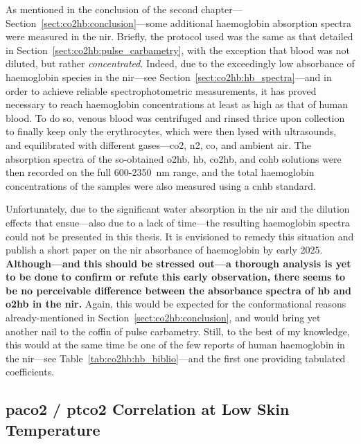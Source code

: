 As mentioned in the conclusion of the second chapter---Section~\ref{sect:co2hb:conclusion}---some additional haemoglobin absorption spectra were measured in the \gls{nir}. Briefly, the protocol used was the same as that detailed in Section~\ref{sect:co2hb:pulse_carbametry}, with the exception that blood was not diluted, but rather \emph{concentrated}. Indeed, due to the exceedingly low absorbance of haemoglobin species in the \gls{nir}---see Section~\ref{sect:co2hb:hb_spectra}---and in order to achieve reliable spectrophotometric measurements, it has proved necessary  to reach haemoglobin concentrations at least as high as that of human blood. To do so, venous blood was centrifuged and rinsed thrice upon collection to finally keep only the erythrocytes, which were then lysed with ultrasounds, and equilibrated with different gases---\gls{co2}, \gls{n2}, \gls{co}, and ambient air. The absorption spectra of the so-obtained \gls{o2hb}, \gls{hb}, \gls{co2hb}, and \gls{cohb} solutions were then recorded on the full 600-2350~nm range, and the total haemoglobin concentrations of the samples were also measured using a \gls{cnhb} standard.

Unfortunately, due to the significant water absorption in the \gls{nir} and the dilution effects that ensue---also due to a lack of time---the resulting haemoglobin spectra could not be presented in this thesis. It is envisioned to remedy this situation and publish a short paper on the \gls{nir} absorbance of haemoglobin by early 2025. \textbf{Although---and this should be stressed out---a thorough analysis is yet to be done to confirm or refute this early observation, there seems to be no perceivable difference between the absorbance spectra of \gls{hb} and \gls{o2hb} in the \gls{nir}.} Again, this would be expected for the conformational reasons already-mentioned in Section~\ref{sect:co2hb:conclusion}, and would bring yet another nail to the coffin of pulse carbametry. Still, to the best of my knowledge, this would at the same time be one of the few reports of human haemoglobin in the \gls{nir}---see Table~\ref{tab:co2hb:hb_biblio}---and the first one providing tabulated coefficients.

\subsection{\texorpdfstring{\gls{paco2} / \gls{ptco2}}{paCO2 / tcpCO2} Correlation at Low Skin Temperature}\label{sect:conclusion:paptccorrel}

